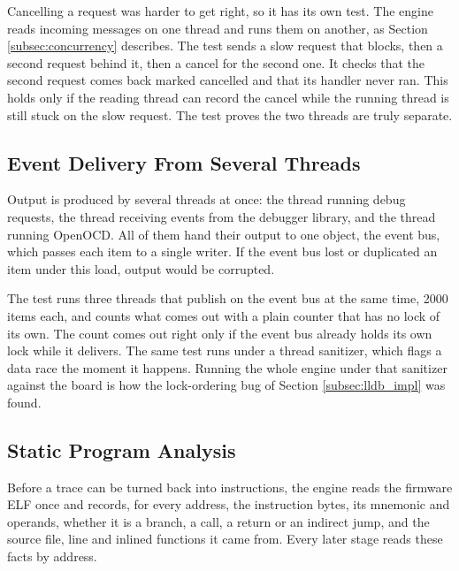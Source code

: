 Cancelling a request was harder to get right, so it has its own test. The engine reads incoming messages on one thread and runs them on another, as Section \ref{subsec:concurrency} describes. The test sends a slow request that blocks, then a second request behind it, then a cancel for the second one. It checks that the second request comes back marked cancelled and that its handler never ran. This holds only if the reading thread can record the cancel while the running thread is still stuck on the slow request. The test proves the two threads are truly separate.

\subsection{Event Delivery From Several Threads}
Output is produced by several threads at once: the thread running debug requests, the thread receiving events from the debugger library, and the thread running OpenOCD. All of them hand their output to one object, the event bus, which passes each item to a single writer. If the event bus lost or duplicated an item under this load, output would be corrupted.

The test runs three threads that publish on the event bus at the same time, 2000 items each, and counts what comes out with a plain counter that has no lock of its own. The count comes out right only if the event bus already holds its own lock while it delivers. The same test runs under a thread sanitizer, which flags a data race the moment it happens. Running the whole engine under that sanitizer against the board is how the lock-ordering bug of Section \ref{subsec:lldb_impl} was found.

\subsection{Static Program Analysis}
Before a trace can be turned back into instructions, the engine reads the firmware ELF once and records, for every address, the instruction bytes, its mnemonic and operands, whether it is a branch, a call, a return or an indirect jump, and the source file, line and inlined functions it came from. Every later stage reads these facts by address.

